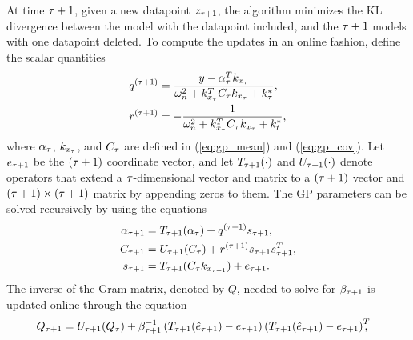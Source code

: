 \documentclass[letterpaper,12pt,peerreviewca,draftcls]{IEEEtran}
\begin{document}
At time $\tau+1$, given a new
datapoint $z_{\tau+1}$, the algorithm minimizes the KL divergence between the
model with the datapoint included, and the $\tau+1$ models with one
datapoint deleted. To compute the updates in an online fashion, define the
scalar quantities
\begin{align}
 q^{(\tau+1)} & = \frac{y-\alpha_\tau^Tk_{x_{\tau}}}
       {\omega_n^2 + k_{x_{\tau}}^TC_\tau k_{x_{\tau}} + k_{\tau}^*}, \label{eq:gp_mean}\\
 r^{(\tau+1)} & = - \frac{1}{\omega_n^2
                       + k_{x_{\tau}}^T C_\tau k_{x_{\tau}} + k_{t}^*},\label{eq:gp_cov}
\end{align}
where $\alpha_\tau$, $k_{x_\tau}$, and $C_\tau$ are defined in
(\ref{eq:gp_mean}) and (\ref{eq:gp_cov}).
Let $e_{\tau+1}$ be the $(\tau+1)$ coordinate vector, and let
$T_{\tau+1}(\cdot)$ and $U_{\tau+1}(\cdot)$ denote operators that extend
a $\tau$-dimensional vector and matrix to a $(\tau+1)$ vector and
$(\tau+1)\times (\tau+1)$ matrix by appending zeros to them.
The GP parameters can be solved recursively by using the equations
\begin{equation}
 \label{eq:recursive_updates}
 \begin{aligned}
 \alpha_{\tau+1} &= T_{\tau+1}(\alpha_\tau) + q^{(\tau+1)}s_{\tau+1}, \\
 C_{\tau+1} &= U_{\tau+1}(C_\tau)
                              + r^{(\tau+1)}s_{\tau+1}s_{\tau+1}^T, \\
 s_{\tau+1} &= T_{\tau+1}(C_\tau k_{x_{\tau+1}}) + e_{\tau+1}.
 \end{aligned}
\end{equation}
The inverse of the Gram matrix, denoted by $Q$, needed to solve for
$\beta_{\tau+1}$ is updated online through the equation
\begin{equation} \label{eq:recursive_gram}
\begin{aligned}
 Q& _{\tau+1} = U_{\tau+1}(Q_{\tau}) + \beta_{\tau+1}^{-1}
     \left(T_{\tau+1}(\hat{e}_{\tau+1})-e_{\tau+1}\right)
     \left(T_{\tau+1}(\hat{e}_{\tau+1})-e_{\tau+1}\right)^T\!\!\!\!,
 \end{aligned}
\end{equation}
\end{document}
